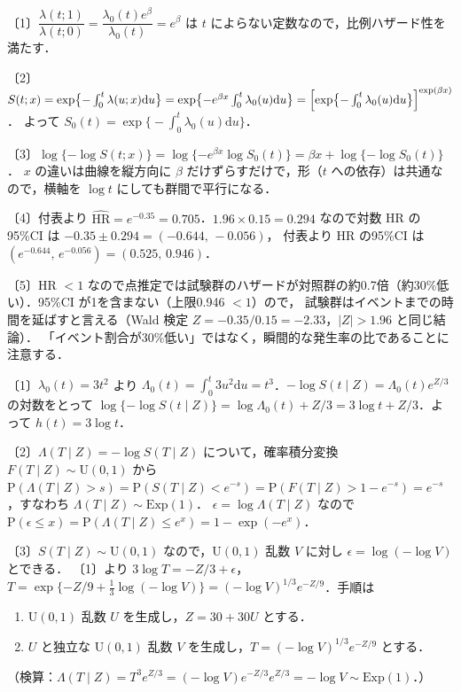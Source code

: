 \documentclass[a4paper,11pt,openany]{ltjsbook}
\newenvironment{kaitou}[1]{%
  \par\medskip\noindent
  \begin{tcolorbox}[enhanced,breakable,colback=bkgray!3,colframe=bkgray!60,boxrule=0.4pt,
    left=4pt,right=4pt,top=2pt,bottom=2pt,arc=1pt,
    title={\cref{#1}の解答},fonttitle=\bfseries\small,coltitle=white,colbacktitle=bkgray!80]}%
  {\end{tcolorbox}\par}
\newcommand{\Prob}{\mathrm{P}}
\newcommand{\dd}{\mathrm{d}}
\newcommand{\HR}{\mathrm{HR}}
\newcommand{\Ex}{\mathrm{Exp}}
\newcommand{\Unif}{\mathrm{U}}
\begin{document}
\begin{kaitou}{reidai:m03-2}
〔1〕$\dfrac{\lambda(t;1)}{\lambda(t;0)}=\dfrac{\lambda_0(t)e^\beta}{\lambda_0(t)}=e^\beta$ は $t$ によらない定数なので，比例ハザード性を満たす．

〔2〕$S(t;x)=\exp\bigl\{-\int_0^t\lambda(u;x)\dd u\bigr\}=\exp\bigl\{-e^{\beta x}\int_0^t\lambda_0(u)\dd u\bigr\}=\Bigl[\exp\bigl\{-\int_0^t\lambda_0(u)\dd u\bigr\}\Bigr]^{\exp(\beta x)}$．
よって $S_0(t)=\exp\bigl\{-\int_0^t\lambda_0(u)\dd u\bigr\}$．

〔3〕$\log\{-\log S(t;x)\}=\log\{-e^{\beta x}\log S_0(t)\}=\beta x+\log\{-\log S_0(t)\}$．
$x$ の違いは曲線を縦方向に $\beta$ だけずらすだけで，形（$t$ への依存）は共通なので，横軸を $\log t$ にしても群間で平行になる．

〔4〕付表より $\widehat{\HR}=e^{-0.35}=0.705$．$1.96\times0.15=0.294$ なので対数 HR の95\%CI は $-0.35\pm0.294=(-0.644,\,-0.056)$，
付表より HR の95\%CI は $(e^{-0.644},\,e^{-0.056})=(0.525,\,0.946)$．

〔5〕HR $<1$ なので点推定では試験群のハザードが対照群の約0.7倍（約30\%低い）．95\%CI が1を含まない（上限0.946 $<1$）ので，
試験群はイベントまでの時間を延ばすと言える（Wald 検定 $Z=-0.35/0.15=-2.33$，$|Z|>1.96$ と同じ結論）．
「イベント割合が30\%低い」ではなく，瞬間的な発生率の比であることに注意する．
\end{kaitou}

\begin{kaitou}{reidai:m03-3}
〔1〕$\lambda_0(t)=3t^2$ より $\Lambda_0(t)=\int_0^t3u^2\dd u=t^3$．$-\log S(t\mid Z)=\Lambda_0(t)e^{Z/3}$ の対数をとって
$\log\{-\log S(t\mid Z)\}=\log\Lambda_0(t)+Z/3=3\log t+Z/3$．よって $h(t)=3\log t$．

〔2〕$\Lambda(T\mid Z)=-\log S(T\mid Z)$ について，確率積分変換 $F(T\mid Z)\sim\Unif(0,1)$ から
$\Prob(\Lambda(T\mid Z)>s)=\Prob(S(T\mid Z)<e^{-s})=\Prob(F(T\mid Z)>1-e^{-s})=e^{-s}$，すなわち $\Lambda(T\mid Z)\sim\Ex(1)$．
$\epsilon=\log\Lambda(T\mid Z)$ なので
$\Prob(\epsilon\le x)=\Prob(\Lambda(T\mid Z)\le e^x)=1-\exp(-e^x)$．

〔3〕$S(T\mid Z)\sim\Unif(0,1)$ なので，$\Unif(0,1)$ 乱数 $V$ に対し $\epsilon=\log(-\log V)$ とできる．
〔1〕より $3\log T=-Z/3+\epsilon$，$T=\exp\{-Z/9+\tfrac13\log(-\log V)\}=(-\log V)^{1/3}e^{-Z/9}$．手順は
\begin{enumerate}[label=Step \arabic*：,leftmargin=*]
\item $\Unif(0,1)$ 乱数 $U$ を生成し，$Z=30+30U$ とする．
\item $U$ と独立な $\Unif(0,1)$ 乱数 $V$ を生成し，$T=(-\log V)^{1/3}e^{-Z/9}$ とする．
\end{enumerate}
（検算：$\Lambda(T\mid Z)=T^3e^{Z/3}=(-\log V)e^{-Z/3}e^{Z/3}=-\log V\sim\Ex(1)$．）
\end{kaitou}
\end{document}
